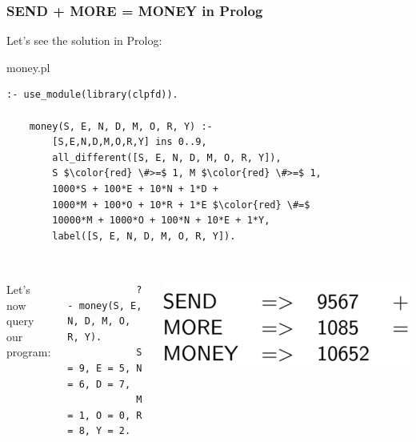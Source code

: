 \begin{frame}[fragile]
\frametitle{SEND + MORE = MONEY in Prolog}

Let's see the solution in Prolog:

\begin{exampleblock}{money.pl}
    \begin{lstlisting}[mathescape]
	:- use_module(library(clpfd)).

	money(S, E, N, D, M, O, R, Y) :-
		[S,E,N,D,M,O,R,Y] ins 0..9,
		all_different([S, E, N, D, M, O, R, Y]),
		S $\color{red} \#>=$ 1, M $\color{red} \#>=$ 1,
		1000*S + 100*E + 10*N + 1*D +
		1000*M + 100*O + 10*R + 1*E $\color{red} \#=$
		10000*M + 1000*O + 100*N + 10*E + 1*Y,
		label([S, E, N, D, M, O, R, Y]).
		
\end{lstlisting}
\end{exampleblock}
	\begin{columns}
Let's now query our program:
        	\begin{lstlisting}
			?- money(S, E, N, D, M, O, R, Y).
			S = 9, E = 5, N = 6, D = 7,
			M = 1, O = 0, R = 8, Y = 2.
			\end{lstlisting}
			\includegraphics[scale=0.04]{img/money_result.png}
	\end{columns}

\end{frame}

